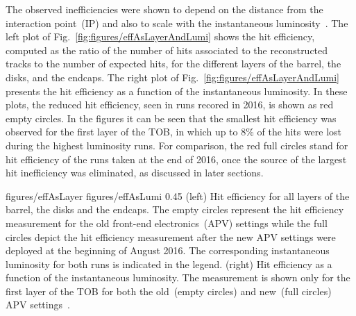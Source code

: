 The observed inefficiencies were shown to depend on the distance from the interaction point~(IP) and also to scale with the instantaneous luminosity~\cite{website:hitEff}. The left plot of Fig.~\ref{fig:figures/effAsLayerAndLumi} shows the hit efficiency, computed as the ratio of the number of hits associated to the reconstructed tracks to the number of expected hits, for the different layers of the barrel, the disks, and the endcaps. The right plot of Fig.~\ref{fig:figures/effAsLayerAndLumi} presents the hit efficiency as a function of the instantaneous luminosity. In these plots, the reduced hit efficiency, seen in runs recored in 2016, is shown as red empty circles. In the figures it can be seen that the smallest hit efficiency was observed for the first layer of the TOB, in which up to 8\% of the hits were lost during the highest luminosity runs. For comparison, the red full circles stand for hit efficiency of the runs taken at the end of 2016, once the source of the largest hit inefficiency was eliminated, as discussed in later sections.


                 {figures/effAsLayer}
                 {figures/effAsLumi} %
                 {0.45}       %
                 {(left) Hit efficiency for all layers of the barrel, the disks and the endcaps. The empty circles represent the hit efficiency measurement for the old front-end electronics~(APV) settings while the full circles depict the hit efficiency measurement after the new APV settings were deployed at the beginning of August 2016. The corresponding instantaneous luminosity for both runs is indicated in the legend. (right) Hit efficiency as a function of the instantaneous luminosity. The measurement is shown only for the first layer of the TOB for both the old~(empty circles) and new~(full circles) APV settings~\cite{website:hitEff}. } %






